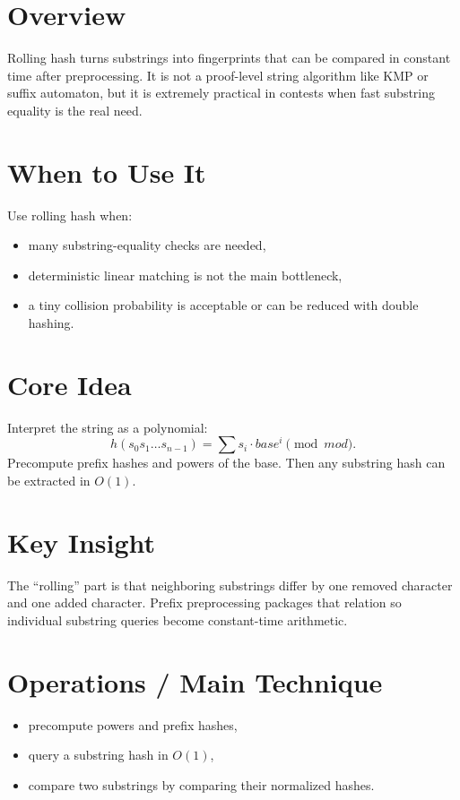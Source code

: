 \section*{Overview}

Rolling hash turns substrings into fingerprints that can be compared in constant time after preprocessing. It is not a
proof-level string algorithm like KMP or suffix automaton, but it is extremely practical in contests when fast
substring equality is the real need.

\section*{When to Use It}

Use rolling hash when:

\begin{itemize}
  \item many substring-equality checks are needed,
  \item deterministic linear matching is not the main bottleneck,
  \item a tiny collision probability is acceptable or can be reduced with double hashing.
\end{itemize}

\section*{Core Idea}

Interpret the string as a polynomial:
\[
h(s_0 s_1 \dots s_{n-1}) = \sum s_i \cdot base^i \pmod{mod}.
\]
Precompute prefix hashes and powers of the base. Then any substring hash can be extracted in \(O(1)\).

\section*{Key Insight}

The ``rolling'' part is that neighboring substrings differ by one removed character and one added character. Prefix
preprocessing packages that relation so individual substring queries become constant-time arithmetic.

\section*{Operations / Main Technique}

\begin{itemize}
  \item precompute powers and prefix hashes,
  \item query a substring hash in \(O(1)\),
  \item compare two substrings by comparing their normalized hashes.
\end{itemize}


